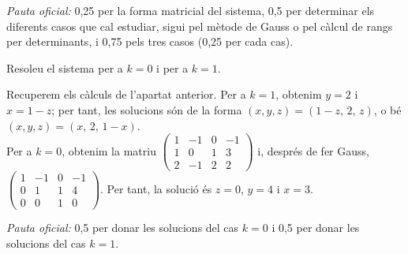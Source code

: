 \begin{apartats}
\begin{solucio}
\textit{Pauta oficial:} 0,25 per la forma matricial del sistema, 0,5 per determinar els diferents casos que cal
estudiar, sigui pel mètode de Gauss o pel càlcul de rangs per determinants, i 0,75 pels tres casos (0,25 per cada
cas).
\end{solucio}

Resoleu el sistema per a $k=0$ i per a $k=1$.

\begin{solucio}
Recuperem els càlculs de l'apartat anterior. Per a $k=1$, obtenim $y=2$ i $x=1-z$; per tant, les solucions són de
la forma $(x,y,z)=(1-z,\,2,\,z)$, o bé $(x,y,z)=(x,\,2,\,1-x)$.\\
Per a $k=0$, obtenim la matriu
$\left(\begin{array}{ccc|c}1&-1&0&-1\\1&0&1&3\\2&-1&2&2\end{array}\right)$ i, després de fer Gauss,
$\left(\begin{array}{ccc|c}1&-1&0&-1\\0&1&1&4\\0&0&1&0\end{array}\right)$. Per tant, la solució és $z=0$, $y=4$ i $x=3$.

\textit{Pauta oficial:} 0,5 per donar les solucions del cas $k=0$ i 0,5 per donar les solucions del cas $k=1$.
\end{solucio}

\end{apartats}
